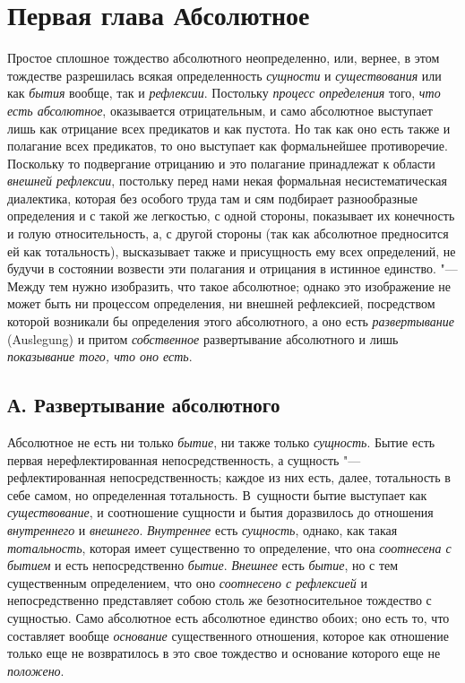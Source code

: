 \chapter[{\em Первая глава} Абсолютное]{Первая глава Абсолютное}

Простое сплошное тождество абсолютного
неопределенно, или, вернее, в этом тождестве разрешилась всякая
определенность {\em сущности} и
{\em существования} или как
{\em бытия} вообще, так и
{\em рефлексии}. Постольку
{\em процесс определения} того,
{\em что есть абсолютное}, оказывается отрицательным, и
само абсолютное выступает лишь как отрицание всех предикатов и как пустота.
Но так как оно есть также и полагание всех предикатов, то оно выступает как
формальнейшее противоречие. Поскольку то подвергание отрицанию и это
полагание принадлежат к области {\em внешней
рефлексии}, постольку перед нами некая формальная несистематическая
диалектика, которая без особого труда там и сям подбирает разнообразные
определения и с такой же легкостью, с одной стороны, показывает их
конечность и голую относительность, а, с другой стороны (так как абсолютное
предносится ей как тотальность), высказывает также и присущность ему всех
определений, не будучи в состоянии возвести эти полагания и отрицания в
истинное единство. "--- Между тем нужно изобразить, что такое абсолютное;
однако это изображение не может быть ни процессом определения, ни внешней
рефлексией, посредством которой возникали бы определения этого абсолютного,
а оно есть {\em развертывание} (Auslegung) и притом
{\em собственное} развертывание абсолютного и лишь
{\em показывание того, что оно есть}.


\section[А. Развертывание абсолютного]{А. Развертывание абсолютного}

Абсолютное не есть ни только
{\em бытие}, ни также только
{\em сущность}. Бытие есть первая нерефлектированная
непосредственность, а сущность "--- рефлектированная непосредственность;
каждое из них есть, далее, тотальность в себе самом, но определенная
тотальность. В~сущности бытие выступает как
{\em существование}, и соотношение сущности и бытия
доразвилось до отношения {\em внутреннего} и
{\em внешнего}. {\em Внутреннее}
есть {\em сущность}, однако, как такая
{\em тотальность}, которая имеет существенно то
определение, что она {\em соотнесена с бытием} и есть
непосредственно {\em бытие}.
{\em Внешнее} есть {\em бытие}, но
с тем существенным определением, что оно
{\em соотнесено с рефлексией} и непосредственно
представляет собою столь же безотносительное тождество с сущностью. Само
абсолютное есть абсолютное единство обоих; оно есть то, что составляет
вообще {\em основание} существенного отношения, которое
как отношение только еще не возвратилось в это свое тождество и основание
которого еще не {\em положено}.


